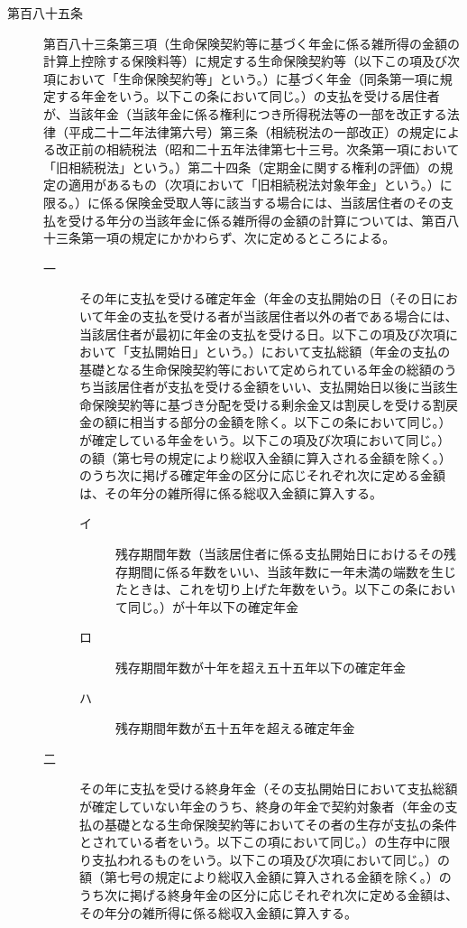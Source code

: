 \documentclass[twocolumn,a4j,10pt]{ltjtarticle}
\begin{document}
\begin{description}
\item[第百八十五条]第百八十三条第三項（生命保険契約等に基づく年金に係る雑所得の金額の計算上控除する保険料等）に規定する生命保険契約等（以下この項及び次項において「生命保険契約等」という。）に基づく年金（同条第一項に規定する年金をいう。以下この条において同じ。）の支払を受ける居住者が、当該年金（当該年金に係る権利につき所得税法等の一部を改正する法律（平成二十二年法律第六号）第三条（相続税法の一部改正）の規定による改正前の相続税法（昭和二十五年法律第七十三号。次条第一項において「旧相続税法」という。）第二十四条（定期金に関する権利の評価）の規定の適用があるもの（次項において「旧相続税法対象年金」という。）に限る。）に係る保険金受取人等に該当する場合には、当該居住者のその支払を受ける年分の当該年金に係る雑所得の金額の計算については、第百八十三条第一項の規定にかかわらず、次に定めるところによる。
\begin{description}
\item[一]その年に支払を受ける確定年金（年金の支払開始の日（その日において年金の支払を受ける者が当該居住者以外の者である場合には、当該居住者が最初に年金の支払を受ける日。以下この項及び次項において「支払開始日」という。）において支払総額（年金の支払の基礎となる生命保険契約等において定められている年金の総額のうち当該居住者が支払を受ける金額をいい、支払開始日以後に当該生命保険契約等に基づき分配を受ける剰余金又は割戻しを受ける割戻金の額に相当する部分の金額を除く。以下この条において同じ。）が確定している年金をいう。以下この項及び次項において同じ。）の額（第七号の規定により総収入金額に算入される金額を除く。）のうち次に掲げる確定年金の区分に応じそれぞれ次に定める金額は、その年分の雑所得に係る総収入金額に算入する。
\begin{description}
\item[イ]残存期間年数（当該居住者に係る支払開始日におけるその残存期間に係る年数をいい、当該年数に一年未満の端数を生じたときは、これを切り上げた年数をいう。以下この条において同じ。）が十年以下の確定年金
\item[ロ]残存期間年数が十年を超え五十五年以下の確定年金
\item[ハ]残存期間年数が五十五年を超える確定年金
\end{description}
\item[二]その年に支払を受ける終身年金（その支払開始日において支払総額が確定していない年金のうち、終身の年金で契約対象者（年金の支払の基礎となる生命保険契約等においてその者の生存が支払の条件とされている者をいう。以下この項において同じ。）の生存中に限り支払われるものをいう。以下この項及び次項において同じ。）の額（第七号の規定により総収入金額に算入される金額を除く。）のうち次に掲げる終身年金の区分に応じそれぞれ次に定める金額は、その年分の雑所得に係る総収入金額に算入する。

\end{description}
\end{description}
\end{document}
